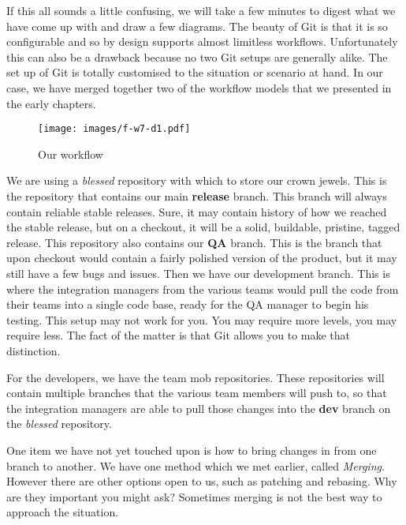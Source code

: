 If this all sounds a little confusing, we will take a few minutes to digest what we have come up with and draw a few diagrams.  The beauty of Git is that it is so configurable and so by design supports almost limitless workflows.  Unfortunately this can also be a drawback because no two Git setups are generally alike.  The set up of Git is totally customised to the situation or scenario at hand.  In our case, we have merged together two of the workflow models that we presented in the early chapters.

\begin{figure}[hbt]
\centering
\texttt{[image: images/f-w7-d1.pdf]}
\caption{Our workflow}
\end{figure}

We are using a \emph{blessed} repository with which to store our crown jewels.  This is the repository that contains our main \textbf{release} branch.  This branch will always contain reliable stable releases.  Sure, it may contain history of how we reached the stable release, but on a checkout, it will be a solid, buildable, pristine, tagged release.  This repository also contains our \textbf{QA} branch.  This is the branch that upon checkout would contain a fairly polished version of the product, but it may still have a few bugs and issues.  Then we have our development branch.  This is where the integration managers from the various teams would pull the code from their teams into a single code base, ready for the QA manager to begin his testing.  This setup may not work for you.  You may require more levels, you may require less.  The fact of the matter is that Git allows you to make that distinction.  

For the developers, we have the team mob repositories.  These repositories will contain multiple branches that the various team members will push to, so that the integration managers are able to pull those changes into the \textbf{dev} branch on the \emph{blessed} repository.

One item we have not yet touched upon is how to bring changes in from one branch to another.  We have one method which we met earlier, called \emph{Merging}.  However there are other options open to us, such as patching and rebasing.  Why are they important you might ask?  Sometimes merging is not the best way to approach the situation.  

